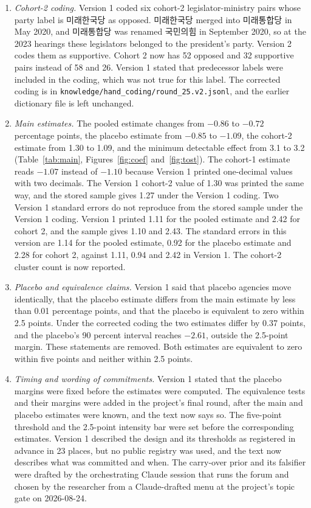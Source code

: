 \documentclass[11pt]{article}
\begin{document}
\begin{enumerate}\setlength{\itemsep}{1pt}\setlength{\parskip}{0pt}
\item \textit{Cohort-2 coding.} Version 1 coded six cohort-2 legislator-ministry pairs whose party label is 미래한국당 as opposed. 미래한국당 merged into 미래통합당 in May 2020, and 미래통합당 was renamed 국민의힘 in September 2020, so at the 2023 hearings these legislators belonged to the president's party. Version 2 codes them as supportive. Cohort 2 now has 52 opposed and 32 supportive pairs instead of 58 and 26. Version 1 stated that predecessor labels were included in the coding, which was not true for this label. The corrected coding is in \texttt{knowledge/hand\_coding/round\_25.v2.jsonl}, and the earlier dictionary file is left unchanged.
\item \textit{Main estimates.} The pooled estimate changes from $-0.86$ to $-0.72$ percentage points, the placebo estimate from $-0.85$ to $-1.09$, the cohort-2 estimate from 1.30 to 1.09, and the minimum detectable effect from 3.1 to 3.2 (Table~\ref{tab:main}, Figures~\ref{fig:coef} and~\ref{fig:tost}). The cohort-1 estimate reads $-1.07$ instead of $-1.10$ because Version 1 printed one-decimal values with two decimals. The Version 1 cohort-2 value of 1.30 was printed the same way, and the stored sample gives 1.27 under the Version 1 coding. Two Version 1 standard errors do not reproduce from the stored sample under the Version 1 coding. Version 1 printed 1.11 for the pooled estimate and 2.42 for cohort 2, and the sample gives 1.10 and 2.43. The standard errors in this version are 1.14 for the pooled estimate, 0.92 for the placebo estimate and 2.28 for cohort 2, against 1.11, 0.94 and 2.42 in Version 1. The cohort-2 cluster count is now reported.
\item \textit{Placebo and equivalence claims.} Version 1 said that placebo agencies move identically, that the placebo estimate differs from the main estimate by less than 0.01 percentage points, and that the placebo is equivalent to zero within 2.5 points. Under the corrected coding the two estimates differ by 0.37 points, and the placebo's 90 percent interval reaches $-2.61$, outside the 2.5-point margin. These statements are removed. Both estimates are equivalent to zero within five points and neither within 2.5 points.
\item \textit{Timing and wording of commitments.} Version 1 stated that the placebo margins were fixed before the estimates were computed. The equivalence tests and their margins were added in the project's final round, after the main and placebo estimates were known, and the text now says so. The five-point threshold and the 2.5-point intensity bar were set before the corresponding estimates. Version 1 described the design and its thresholds as registered in advance in 23 places, but no public registry was used, and the text now describes what was committed and when. The carry-over prior and its falsifier were drafted by the orchestrating Claude session that runs the forum and chosen by the researcher from a Claude-drafted menu at the project's topic gate on 2026-08-24.

\end{enumerate}
\end{document}
